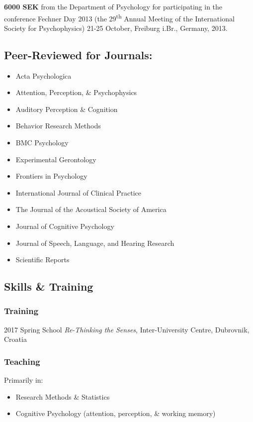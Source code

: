 \documentclass[]{article}
\providecommand{\tightlist}{%
  \setlength{\itemsep}{0pt}\setlength{\parskip}{0pt}}
\begin{document}
\textbf{6000 SEK} from the Department of Psychology for participating in
the conference Fechner Day 2013 (the 29\textsuperscript{th} Annual
Meeting of the International Society for Psychophysics) 21-25 October,
Freiburg i.Br., Germany, 2013.

\subsection{Peer-Reviewed for
Journals:}\label{peer-reviewed-for-journals}

\begin{itemize}
\item
  Acta Psychologica
\item
  Attention, Perception, \& Psychophysics
\item
  Auditory Perception \& Cognition
\item
  Behavior Research Methods
\item
  BMC Psychology
\item
  Experimental Gerontology
\item
  Frontiers in Psychology
\item
  International Journal of Clinical Practice
\item
  The Journal of the Acoustical Society of America
\item
  Journal of Cognitive Psychology
\item
  Journal of Speech, Language, and Hearing Research
\item
  Scientific Reports
\end{itemize}

\subsection{Skills \& Training}\label{skills-training}

\subsubsection{Training}\label{training}

2017 Spring School \emph{Re-Thinking the Senses}, Inter-University
Centre, Dubrovnik, Croatia

\subsubsection{Teaching}\label{teaching}

Primarily in:

\begin{itemize}
\tightlist
\item
  Research Methods \& Statistics
\item
  Cognitive Psychology (attention, perception, \& working memory)
\end{itemize}
\end{document}
